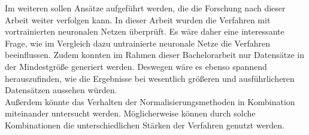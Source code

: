 Im  weiteren sollen Ansätze aufgeführt werden, die die Forschung nach dieser Arbeit weiter verfolgen kann. In dieser Arbeit wurden die Verfahren mit vortrainierten neuronalen Netzen überprüft. Es wäre daher eine interessante Frage, wie im Vergleich dazu untrainierte neuronale Netze die Verfahren beeinflussen. Zudem konnten im Rahmen dieser Bachelorarbeit nur Datensätze in der Mindestgröße generiert werden. Deswegen wäre es ebenso spannend herauszufinden, wie die Ergebnisse bei wesentlich größeren und ausführlicheren Datensätzen aussehen würden.\\
Außerdem könnte das Verhalten der Normalisierungsmethoden in Kombination miteinander untersucht werden. Möglicherweise können durch solche Kombinationen die unterschiedlichen Stärken der Verfahren genutzt werden.  
